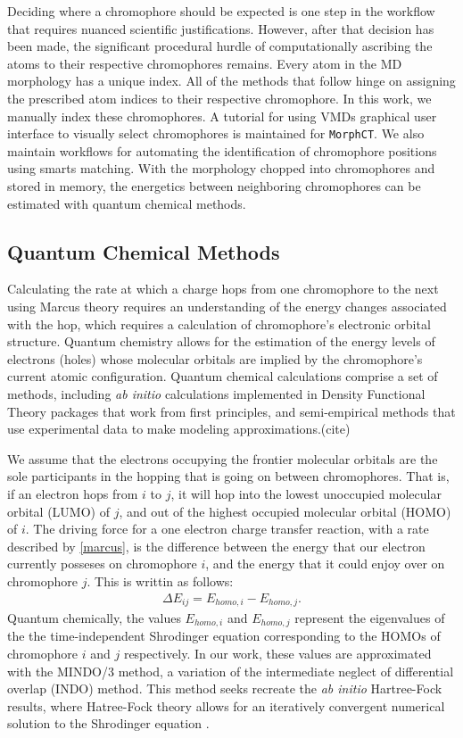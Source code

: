 Deciding where a chromophore should be expected is one step in the workflow that requires nuanced
scientific justifications. However, after that decision has been made, the significant procedural hurdle of 
computationally ascribing the atoms to their respective chromophores remains. 
Every atom in the MD morphology has a unique index. All of the methods that follow hinge on assigning the prescribed atom indices to their respective chromophore. 
In this work, we manually index these chromophores. A tutorial for using VMDs graphical user interface to
visually select chromophores is maintained for \texttt{MorphCT}.
We also maintain workflows for automating the identification of chromophore positions using smarts
matching. With the morphology chopped into chromophores and stored in memory, the energetics between
neighboring chromophores can be estimated with quantum chemical methods.

\subsection{Quantum Chemical Methods}
\label{qccmethods}

Calculating the rate at which a charge hops from one chromophore to the next
using Marcus theory requires an understanding of the energy changes associated with the hop, 
which requires a calculation of chromophore's electronic orbital structure.
Quantum chemistry allows for the estimation of the energy levels of electrons (holes) whose molecular orbitals 
are implied by the chromophore's current atomic configuration. 
Quantum chemical calculations comprise a set of methods, including \textit{ab initio} calculations implemented 
in Density Functional Theory packages that work from first principles, 
and semi-empirical methods that use experimental data to make modeling approximations.(cite)

We assume that the electrons occupying the frontier molecular orbitals are the sole participants in the
hopping that is going on between chromophores. That is, if an electron hops from $i$ to $j$, it will hop
into the lowest unoccupied molecular orbital (LUMO) of $j$, and out of the
highest occupied molecular orbital (HOMO) of $i$.
The driving force for a one electron charge transfer reaction, 
with a rate described by \autoref{marcus}, is the difference between the energy that our electron 
currently posseses 
on chromophore $i$, and the energy that it could enjoy over on chromophore $j$. 
This is writtin as follows:
\begin{align}
    \Delta E_{ij} = E_{homo, i} - E_{homo, j}.
    \label{gibbs}
\end{align}
Quantum chemically, the values $E_{homo, i}$ and $E_{homo, j}$ represent the eigenvalues of the the
time-independent Shrodinger equation corresponding to the HOMOs of chromophore $i$ and $j$ respectively. 
In our work, these values are approximated with the MINDO/3 method, a variation of the intermediate neglect of 
differential overlap (INDO) method. This method seeks recreate the \textit{ab initio} Hartree-Fock
results, where Hatree-Fock theory allows for an iteratively convergent numerical solution to the
Shrodinger equation \cite{Thiel2014}. 


